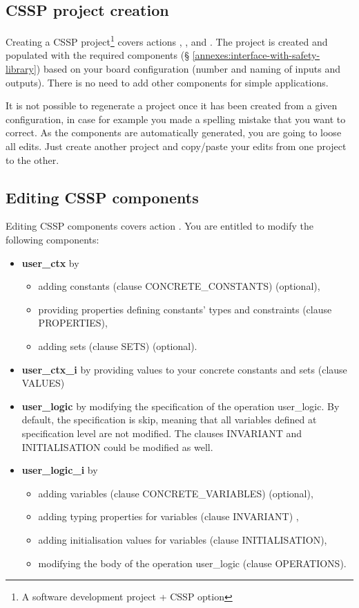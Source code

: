 \subsection{CSSP project creation}

Creating a CSSP project\footnote{A software development project + CSSP option} covers actions , , and . The project is created and populated with the required components (§ \ref{annexes:interface-with-safety-library}) based on your board configuration (number and naming of inputs and outputs). There is no need to add other components for simple applications. 
\begin{remark}
It is not possible to regenerate a project once it has been created from a given configuration, in case for example you made a spelling mistake that you want to correct. As the components are automatically generated, you are going to loose all edits. Just create another project and copy/paste your edits from one project to the other.
\end{remark}

\subsection{Editing CSSP components}

Editing CSSP components covers action . You are entitled to modify the following components:
\begin{itemize}
    \item \textbf{user\_ctx} by 
    \begin{itemize}    
        \item adding constants (clause CONCRETE\_CONSTANTS) (optional),
        \item providing properties defining constants' types and constraints (clause PROPERTIES),
        \item adding sets (clause SETS) (optional).
    \end{itemize}   
    \item \textbf{user\_ctx\_i} by providing values to your concrete constants and sets (clause VALUES)
    \item \textbf{user\_logic} by modifying the specification of the operation user\_logic. By default, the specification is skip, meaning that all variables defined at specification level are not modified. The clauses INVARIANT and INITIALISATION could be modified as well.
    \item \textbf{user\_logic\_i} by 
    \begin{itemize}    
        \item adding variables (clause CONCRETE\_VARIABLES) (optional),
        \item adding typing properties for variables (clause INVARIANT) ,
        \item adding initialisation values for variables (clause INITIALISATION),
        \item modifying the body of the operation user\_logic (clause OPERATIONS).
    \end{itemize}   
\end{itemize}

